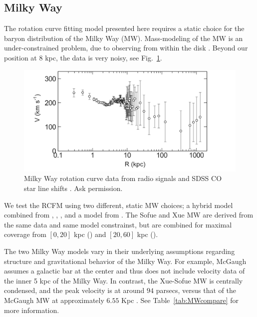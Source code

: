 \documentclass[reprint,%
 amsmath,amssymb,
 aps,
]{revtex4-1}
\begin{document}
 
   

  
 


\subsection{Milky Way}\label{MWselect}


The rotation curve fitting model presented here requires a static choice for the baryon distribution of the   Milky Way (MW). 
Mass-modeling of the MW is an under-constrained problem, due to     observing from       within  the disk  \cite{1991ARA&A..29..409F}.
 Beyond our position at 8 kpc, the data is very 
 noisy, see  Fig.~\ref{fig:mwSofue}.  
 
 
 \begin{figure}
   \centering
   \includegraphics[width=\linewidth]{Sofue_MWtoLGData}
   \caption{ Milky Way rotation curve data from radio signals and SDSS CO star line shifts  \cite{Sof11}. Ask permission.}
  \label{fig:mwSofue}
\end{figure}

 We test the RCFM   using two different, static MW choices; 
   a hybrid model combined from  \citet{Xue}, 
  \citet{Sofue}, \cite{sofue2009unified}, and 
  a model from  \citet{McGaugh_2019}. The Sofue and Xue MW are derived from the same data and same model constrainst, but are combined for maximal coverage from  $[0,20]$ kpc
  (\citet{Sofue})   and  $[20,60]$ kpc  (\citet{Xue}). 
  
   The  two Milky Way models vary in their underlying assumptions regarding structure and gravitational behavior of the Milky Way. For example, McGaugh \cite{McGaugh_2019} assumes a galactic bar at the center and thus does not include velocity data of the inner 5 kpc of the Milky Way.  In contrast, the Xue-Sofue MW is centrally condensed, and the peak velocity is   at around $94$ parsecs, versus that of  the McGaugh MW   at  approximately  $6.55$ Kpc   \cite{McGaugh_2019}. See Table~\ref{tab:MWcompare} for more information.
   
\end{document}
